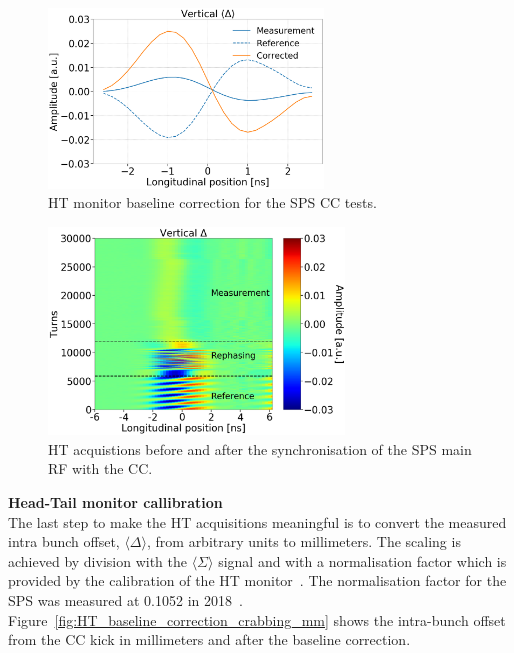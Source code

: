 \begin{figure}[!h]
   \centering         
   \includegraphics[width=0.65\textwidth]{images/Ch4/HT_measures_vs_reference_vs_corrected__20180530_135105_baseline_correction_new_version.png}
       \caption{HT monitor baseline correction for the SPS CC tests.}
       \label{fig:HT_baseline_correction}
\end{figure}

\begin{figure}[!h]
   \centering         
   \includegraphics[width=0.7\textwidth]{images/Ch4/HT_2D__20180530_135105_before_after_sunchronisation_new_version.png}
       \caption{HT acquistions before and after the synchronisation of the SPS main RF with the CC.}
       \label{fig:HT_baseline_correction_measurements_2D}
\end{figure}

\normalsize{\textbf{Head-Tail monitor callibration}}\\
The last step to make the HT acquisitions meaningful is to convert the measured intra bunch offset, $\langle \Delta \rangle$, from arbitrary units to millimeters. The scaling is achieved by division with the $\langle \Sigma \rangle$ signal and with a normalisation factor which is provided by the calibration of the HT monitor~\cite{PhysRevAccelBeams.22.112803}. The normalisation factor for the SPS was measured at 0.1052 in 2018~\cite{HT_calibration_2018}. Figure~\ref{fig:HT_baseline_correction_crabbing_mm} shows the intra-bunch offset from the CC kick in millimeters and after the baseline correction. 


